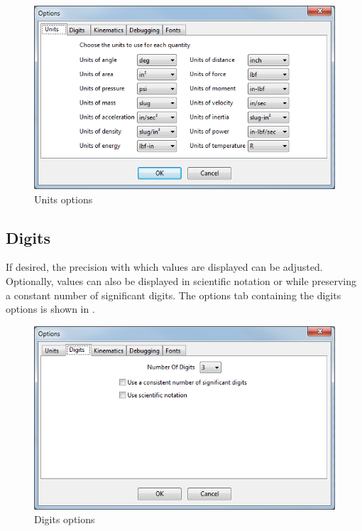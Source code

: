 \begin{figure}
  \includegraphics[width=\textwidth]{images/optionsUnits}
  \caption{Units options} \label{fig:optionsUnits}
  \centering
\end{figure}

\subsection{Digits} \label{ssec:optionsDigits}

If desired, the precision with which values are displayed can be adjusted.  Optionally, values can also be displayed in scientific notation or while preserving a constant number of significant digits.  The options tab containing the digits options is shown in .

\begin{figure}
  \includegraphics[width=\textwidth]{images/optionsDigits}
  \caption{Digits options} \label{fig:optionsDigits}
  \centering
\end{figure}

